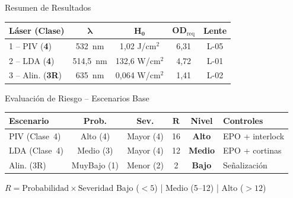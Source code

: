 \documentclass[aspectratio=169,12pt]{beamer}
\begin{document}
\begin{frame}{Resumen de Resultados}
	\centering
	\begin{tabular}{lcccc}
		\toprule
		\textbf{Láser (Clase)}   & $\boldsymbol{\lambda}$         & $\boldsymbol{H_0}$
		                         & $\boldsymbol{OD_\mathrm{req}}$ & \textbf{Lente}                   \\
		\midrule
		\rowcolor{aerored!15}
		1 -- PIV (\textbf{4})    & 532~nm                         & 1,02 J/cm$^2$      & 6,31 & L-05 \\
		\rowcolor{aerored!10}
		2 -- LDA (\textbf{4})    & 514,5~nm                       & 132,6 W/cm$^2$     & 4,72 & L-01 \\
		\rowcolor{aeroyellow!15}
		3 -- Alin. (\textbf{3R}) & 635~nm                         & 0,064 W/cm$^2$     & 1,41 & L-02 \\
		\bottomrule
	\end{tabular}

	\vspace{0.5cm}
\end{frame}

\begin{frame}{Evaluación de Riesgo -- Escenarios Base}
	\centering
	\small
	\begin{tabular}{l c c c c l}
		\toprule
		\textbf{Escenario} & \textbf{Prob.}                                  & \textbf{Sev.}      & $\boldsymbol{R}$
		                   & \textbf{Nivel}                                  & \textbf{Controles}                    \\
		\midrule
		\rowcolor{aerored!15}
		PIV (Clase~4)      & Alto (4)                                        & Mayor (4)          & 16
		                   & \textcolor{aerored}{\textbf{Alto}}              & EPO + interlock                       \\
		\rowcolor{aeroyellow!15}
		LDA (Clase~4)      & Medio (3)                                       & Mayor (4)          & 12
		                   & \textcolor{aeroyellow!80!black}{\textbf{Medio}} & EPO + cortinas                        \\
		\rowcolor{aerogreen!15}
		Alin. (3R)         & MuyBajo (1)                                     & Menor (2)          & 2
		                   & \textcolor{aerogreen}{\textbf{Bajo}}            & Señalización                          \\
		\bottomrule
	\end{tabular}

	\vspace{0.4cm}
	\begin{block}{$R = \text{Probabilidad} \times \text{Severidad}$}
		Bajo ($<5$) \quad | \quad Medio (5--12) \quad | \quad Alto ($>12$)
	\end{block}
\end{frame}
\end{document}
